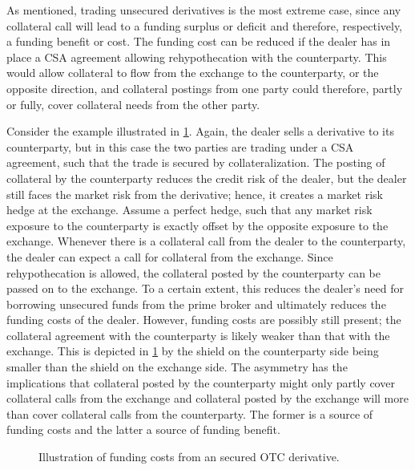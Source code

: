 \documentclass[main.tex]{subfiles}
\begin{document}
        As mentioned, trading unsecured derivatives is the most extreme case,
        since any collateral call will lead to a funding surplus or deficit 
        and therefore, respectively, a funding benefit or cost.
        The funding cost can be reduced if the dealer has in place 
        a CSA agreement allowing rehypothecation with the counterparty.
        This would allow collateral to flow from the exchange to the counterparty, or the opposite direction, 
        and collateral postings from one party could therefore, partly or fully, 
        cover collateral needs from the other party.

        Consider the example illustrated in \cref{fig:funding-costs-secured-derivative}.
        Again, the dealer sells a derivative to its counterparty,
        but in this case the two parties are trading under a CSA agreement, 
        such that the trade is secured by collateralization.
        The posting of collateral by the counterparty reduces the credit risk of the dealer,
        but the dealer still faces the market risk from the derivative;
        hence, it creates a market risk hedge at the exchange.
        Assume a perfect hedge, such that any market risk exposure to the counterparty 
        is exactly offset by the opposite exposure to the exchange.
        Whenever there is a collateral call from the dealer to the counterparty,
        the dealer can expect a call for collateral from the exchange.
        Since rehypothecation is allowed,
        the collateral posted by the counterparty can be passed on to the exchange.
        To a certain extent, this reduces the dealer's need for borrowing unsecured funds from the prime broker
        and ultimately reduces the funding costs of the dealer.
        However, funding costs are possibly still present;
        the collateral agreement with the counterparty is likely weaker than that with the exchange. 
        This is depicted in \cref{fig:funding-costs-secured-derivative} 
        by the shield on the counterparty side being smaller than the shield on the exchange side.
        The asymmetry has the implications that 
        collateral posted by the counterparty might only partly cover collateral calls from the exchange 
        and collateral posted by the exchange will more than cover collateral calls from the counterparty.
        The former is a source of funding costs and the latter a source of funding benefit.

        \begin{figure}
            \centering
            \resizebox{\textwidth}{!}{%
            \begin{tikzpicture}
                
            \end{tikzpicture}        
            }   
            \caption{Illustration of funding costs from an secured OTC derivative.}
            \label{fig:funding-costs-secured-derivative}
        \end{figure}
\end{document}

